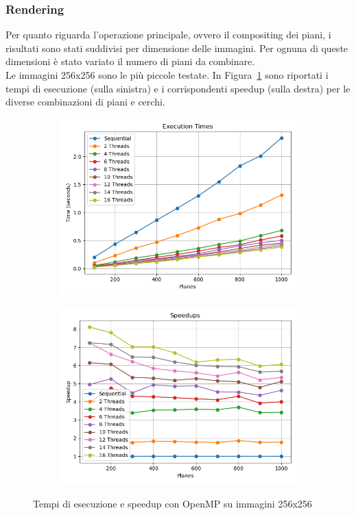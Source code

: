 \subsubsection{Rendering}
Per quanto riguarda l'operazione principale, ovvero il compositing dei piani, i risultati sono stati suddivisi per dimensione delle immagini.
Per ognuna di queste dimensioni è stato variato il numero di piani da combinare.\\
Le immagini 256x256 sono le più piccole testate.
In Figura~\ref{fig:omp_256} sono riportati i tempi di esecuzione (sulla sinistra) e i corrispondenti speedup
(sulla destra) per le diverse combinazioni di piani e cerchi.
\begin{figure}[H]
    \centering
    \begin{subfigure}{0.49\textwidth}
        \centering
        \includegraphics[width=\textwidth]{../result_16/plots/256/results_times}
    \end{subfigure}
    \begin{subfigure}{0.49\textwidth}
        \centering
        \includegraphics[width=\textwidth]{../result_16/plots/256/results_speedup}
    \end{subfigure}
    \caption{Tempi di esecuzione e speedup con OpenMP su immagini 256x256}
    \label{fig:omp_256}
\end{figure}

